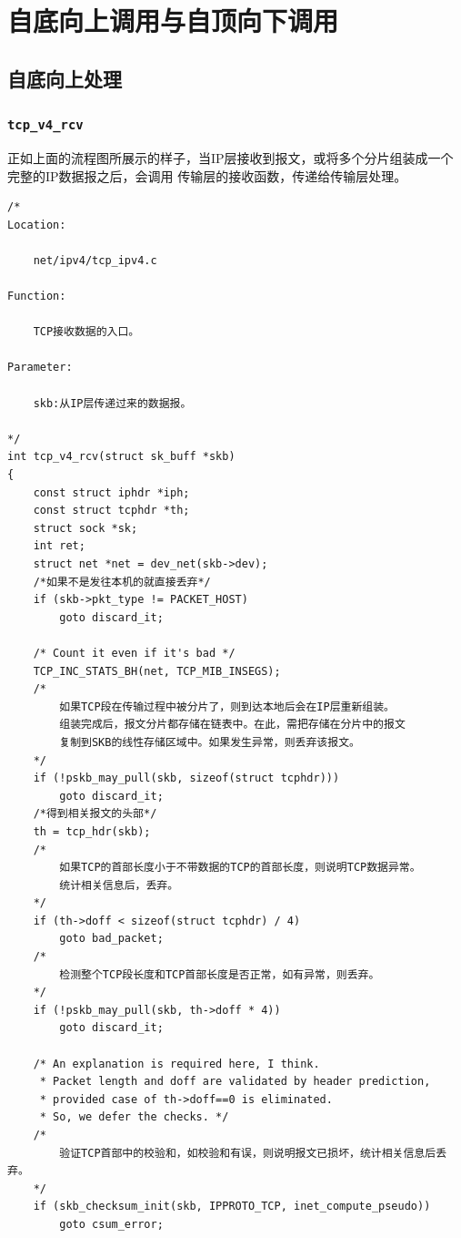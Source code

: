     \section{自底向上调用与自顶向下调用}
        \subsection{自底向上处理}
            \subsubsection{\texttt{tcp_v4_rcv}}
                正如上面的流程图所展示的样子，当IP层接收到报文，或将多个分片组装成一个完整的IP数据报之后，会调用
                传输层的接收函数，传递给传输层处理。
\begin{verbatim}
/*
Location:

    net/ipv4/tcp_ipv4.c

Function:

    TCP接收数据的入口。

Parameter:

    skb:从IP层传递过来的数据报。

*/
int tcp_v4_rcv(struct sk_buff *skb)
{
    const struct iphdr *iph;
    const struct tcphdr *th;
    struct sock *sk;
    int ret;
    struct net *net = dev_net(skb->dev);
    /*如果不是发往本机的就直接丢弃*/
    if (skb->pkt_type != PACKET_HOST)
        goto discard_it;

    /* Count it even if it's bad */
    TCP_INC_STATS_BH(net, TCP_MIB_INSEGS);
    /*
        如果TCP段在传输过程中被分片了，则到达本地后会在IP层重新组装。
        组装完成后，报文分片都存储在链表中。在此，需把存储在分片中的报文
        复制到SKB的线性存储区域中。如果发生异常，则丢弃该报文。
    */
    if (!pskb_may_pull(skb, sizeof(struct tcphdr)))
        goto discard_it;
    /*得到相关报文的头部*/
    th = tcp_hdr(skb);
    /*
        如果TCP的首部长度小于不带数据的TCP的首部长度，则说明TCP数据异常。
        统计相关信息后，丢弃。
    */
    if (th->doff < sizeof(struct tcphdr) / 4)
        goto bad_packet;
    /*
        检测整个TCP段长度和TCP首部长度是否正常，如有异常，则丢弃。
    */  
    if (!pskb_may_pull(skb, th->doff * 4))
        goto discard_it;

    /* An explanation is required here, I think.
     * Packet length and doff are validated by header prediction,
     * provided case of th->doff==0 is eliminated.
     * So, we defer the checks. */
    /*
        验证TCP首部中的校验和，如校验和有误，则说明报文已损坏，统计相关信息后丢弃。
    */
    if (skb_checksum_init(skb, IPPROTO_TCP, inet_compute_pseudo))
        goto csum_error;
\end{verbatim}

